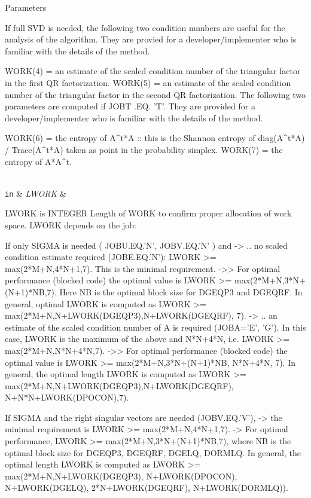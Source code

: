 \begin{DoxyParams}[1]{Parameters}
\begin{DoxyVerb}
          If full SVD is needed, the following two condition numbers are
          useful for the analysis of the algorithm. They are provied for
          a developer/implementer who is familiar with the details of
          the method.

          WORK(4) = an estimate of the scaled condition number of the
                    triangular factor in the first QR factorization.
          WORK(5) = an estimate of the scaled condition number of the
                    triangular factor in the second QR factorization.
          The following two parameters are computed if JOBT .EQ. 'T'.
          They are provided for a developer/implementer who is familiar
          with the details of the method.

          WORK(6) = the entropy of A^t*A :: this is the Shannon entropy
                    of diag(A^t*A) / Trace(A^t*A) taken as point in the
                    probability simplex.
          WORK(7) = the entropy of A*A^t.\end{DoxyVerb}
\\
\hline
\mbox{\tt in}  & {\em L\+W\+O\+R\+K} & \begin{DoxyVerb}          LWORK is INTEGER
          Length of WORK to confirm proper allocation of work space.
          LWORK depends on the job:

          If only SIGMA is needed ( JOBU.EQ.'N', JOBV.EQ.'N' ) and
            -> .. no scaled condition estimate required (JOBE.EQ.'N'):
               LWORK >= max(2*M+N,4*N+1,7). This is the minimal requirement.
               ->> For optimal performance (blocked code) the optimal value
               is LWORK >= max(2*M+N,3*N+(N+1)*NB,7). Here NB is the optimal
               block size for DGEQP3 and DGEQRF.
               In general, optimal LWORK is computed as 
               LWORK >= max(2*M+N,N+LWORK(DGEQP3),N+LWORK(DGEQRF), 7).        
            -> .. an estimate of the scaled condition number of A is
               required (JOBA='E', 'G'). In this case, LWORK is the maximum
               of the above and N*N+4*N, i.e. LWORK >= max(2*M+N,N*N+4*N,7).
               ->> For optimal performance (blocked code) the optimal value 
               is LWORK >= max(2*M+N,3*N+(N+1)*NB, N*N+4*N, 7).
               In general, the optimal length LWORK is computed as
               LWORK >= max(2*M+N,N+LWORK(DGEQP3),N+LWORK(DGEQRF), 
                                                     N+N*N+LWORK(DPOCON),7).

          If SIGMA and the right singular vectors are needed (JOBV.EQ.'V'),
            -> the minimal requirement is LWORK >= max(2*M+N,4*N+1,7).
            -> For optimal performance, LWORK >= max(2*M+N,3*N+(N+1)*NB,7),
               where NB is the optimal block size for DGEQP3, DGEQRF, DGELQ,
               DORMLQ. In general, the optimal length LWORK is computed as
               LWORK >= max(2*M+N,N+LWORK(DGEQP3), N+LWORK(DPOCON), 
                       N+LWORK(DGELQ), 2*N+LWORK(DGEQRF), N+LWORK(DORMLQ)).


\end{DoxyVerb}
\end{DoxyParams}
